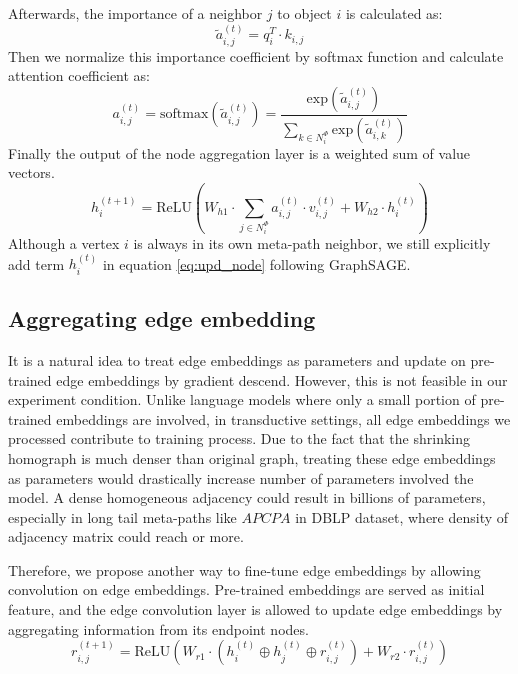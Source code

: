 \noindent Afterwards, the importance of a neighbor $j$ to object $i$ is calculated as:
\begin{equation}
\label{eq:dot}
\tilde{a}^{(t)}_{i,j} = q_i^T \cdot k_{i,j}
\end{equation}
Then we normalize this importance coefficient by softmax function and calculate attention coefficient as:
\begin{equation}
\label{eq:softmax}
a^{(t)}_{i,j} = \text{softmax}(\tilde{a}^{(t)}_{i,j}) = \dfrac{\text{exp}(\tilde{a}^{(t)}_{i,j})}{\sum_{k\in N^\Phi_i}\text{exp}(\tilde{a}^{(t)}_{i,k})}
\end{equation}
Finally the output of the node aggregation layer is a weighted sum of value vectors. 
\begin{equation}
\label{eq:upd_node}
h^{(t+1)}_i = \text{ReLU}( W_{h1}\cdot \sum_{j\in N^\Phi_i} a^{(t)}_{i,j} \cdot v^{(t)}_{i,j} + W_{h2}\cdot h^{(t)}_i) 
\end{equation} 
Although a vertex $i$ is always in its own meta-path neighbor, we still explicitly add term $h^{(t)}_i$ in equation \ref{eq:upd_node} following GraphSAGE\cite{HamiltonYL17}.

\subsection{Aggregating edge embedding}
It is a natural idea to treat edge embeddings as parameters and update on pre-trained edge embeddings by gradient descend. However, this is not feasible in our experiment condition. Unlike language models where only a small portion of pre-trained embeddings are involved, in transductive settings, all edge embeddings we processed contribute to training process. 
Due to the fact that the shrinking homograph is much denser than original graph, treating these edge embeddings as parameters would drastically increase number of parameters involved the model. A dense homogeneous adjacency could result in billions of parameters, especially in long tail meta-paths like $APCPA$ in DBLP dataset, where density of adjacency matrix could reach  or more.

Therefore, we propose another way to fine-tune edge embeddings by allowing convolution on edge embeddings. Pre-trained embeddings are served as initial feature, and the edge convolution layer is allowed to update edge embeddings by aggregating information from its endpoint nodes. 
\begin{equation}
\label{eq:upd_edge}
r^{(t+1)}_{i,j} = \text{ReLU}(W_{r1}\cdot (h^{(t)}_i \oplus h^{(t)}_j \oplus r^{(t)}_{i,j}) + W_{r2}\cdot r^{(t)}_{i,j}) 
\end{equation} 

